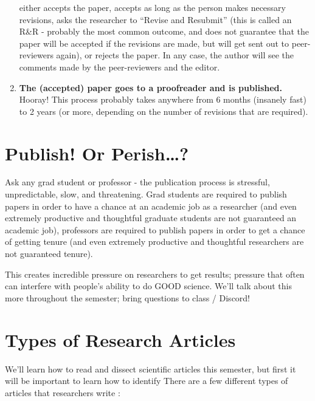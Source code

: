 \documentclass[
  letterpaper,
  DIV=11,
  numbers=noendperiod,
  oneside]{scrreprt}
\begin{document}
\begin{enumerate}
  either accepts the paper, accepts as long as the person makes
  necessary revisions, asks the researcher to ``Revise and Resubmit''
  (this is called an R\&R - probably the most common outcome, and does
  not guarantee that the paper will be accepted if the revisions are
  made, but will get sent out to peer-reviewers again), or rejects the
  paper. In any case, the author will see the comments made by the
  peer-reviewers and the editor.
\item
  \textbf{The (accepted) paper goes to a proofreader and is published.}
  Hooray! This process probably takes anywhere from 6 months (insanely
  fast) to 2 years (or more, depending on the number of revisions that
  are required).
\end{enumerate}

\section{Publish! Or Perish\ldots?}\label{publish-or-perish}

Ask any grad student or professor - the publication process is
stressful, unpredictable, slow, and threatening. Grad students are
required to publish papers in order to have a chance at an academic job
as a researcher (and even extremely productive and thoughtful graduate
students are not guaranteed an academic job), professors are required to
publish papers in order to get a chance of getting tenure (and even
extremely productive and thoughtful researchers are not guaranteed
tenure).

This creates incredible pressure on researchers to get results; pressure
that often can interfere with people's ability to do GOOD science. We'll
talk about this more throughout the semester; bring questions to class /
Discord!

\section{Types of Research Articles}\label{types-of-research-articles}

We'll learn how to read and dissect scientific articles this semester,
but first it will be important to learn how to identify There are a few
different types of articles that researchers write :
\end{document}
